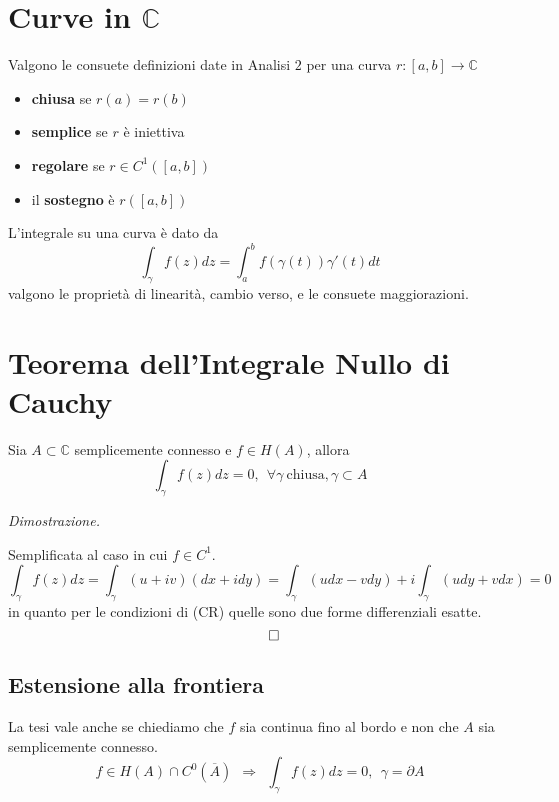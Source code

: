 
\section{Curve in $\mathbb{C}$}

Valgono le consuete definizioni date in Analisi $2$ per una curva $r:[ a,b]\rightarrow \mathbb{C}$
\begin{itemize}
\item \textbf{chiusa} se $r( a) =r( b)$
\item \textbf{semplice} se $r$ è iniettiva
\item \textbf{regolare} se $r\in C^{1}([ a,b])$
\item il \textbf{sostegno} è $r([ a,b])$
\end{itemize}

L'integrale su una curva è dato da
\begin{equation*}
\int _{\gamma } f( z) dz=\int ^{b}_{a} f( \gamma ( t)) \gamma '( t) dt
\end{equation*}
valgono le proprietà di linearità, cambio verso, e le consuete maggiorazioni.
\section{Teorema dell'Integrale Nullo di Cauchy}
\begin{thm}
 Sia $A\subset \mathbb{C}$ semplicemente connesso e $f\in H( A)$, allora
\begin{equation*}
\int _{\gamma } f( z) dz=0,\ \ \forall \gamma \ \text{chiusa} ,\gamma \subset A
\end{equation*}
\end{thm}
\textit{Dimostrazione.}

Semplificata al caso in cui $f\in C^{1}$.
\begin{equation*}
\int _{\gamma } f( z) dz=\int _{\gamma }( u+iv)( dx+idy) =\int _{\gamma }( udx-vdy) +i\int _{\gamma }( udy+vdx) =0
\end{equation*}
in quanto per le condizioni di (CR) quelle sono due forme differenziali esatte.
\begin{equation*}
\qed 
\end{equation*}
\subsection{Estensione alla frontiera}

La tesi vale anche se chiediamo che $f$ sia continua fino al bordo e non che $A$ sia semplicemente connesso.
\begin{equation*}
f\in H( A) \cap C^{0}(\overline{A}) \ \ \Rightarrow \ \ \int _{\gamma } f( z) dz=0,\ \ \gamma =\partial A
\end{equation*}
